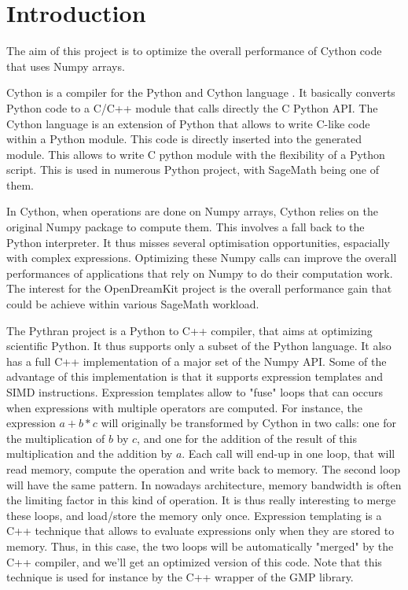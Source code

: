 \documentclass{deliverablereport}
\author{}
\begin{document}
\maketitle
%
\strut\githubissuedescription
\newpage\tableofcontents\newpage

\section{Introduction}

The aim of this project is to optimize the overall performance of Cython code
that uses Numpy arrays.

Cython is a compiler for the Python and Cython language . It basically converts
Python code to a C/C++ module that calls directly the C Python API. The Cython
language is an extension of Python that allows to write C-like code within a
Python module. This code is directly inserted into the generated module. This
allows to write C python module with the flexibility of a Python script. This
is used in numerous Python project, with SageMath being one of them.

In Cython, when operations are done on Numpy arrays, Cython relies on the
original Numpy package to compute them. This involves a fall back to the Python
interpreter. It thus misses several optimisation opportunities, espacially with
complex expressions. Optimizing these Numpy calls can improve the overall
performances of applications that rely on Numpy to do their computation work.
The interest for the OpenDreamKit project is the overall performance gain that
could be achieve within various SageMath workload.

The Pythran project is a Python to C++ compiler, that aims at optimizing
scientific Python. It thus supports only a subset of the Python language.
It also has a full C++ implementation of a major set of the Numpy API. Some of
the advantage of this implementation is that it supports expression templates
and SIMD instructions. Expression templates allow to "fuse" loops that can
occurs when expressions with multiple operators are computed. For instance,
the expression $a+b*c$ will originally be transformed by Cython in two calls: one
for the multiplication of $b$ by $c$, and one for the addition of the result of
this multiplication and the addition by $a$. Each call will end-up in one loop,
that will read memory, compute the operation and write back to memory. The
second loop will have the same pattern. In nowadays architecture, memory
bandwidth is often the limiting factor in this kind of operation. It is thus
really interesting to merge these loops, and load/store the memory only once.
Expression templating is a C++ technique that allows to evaluate expressions
only when they are stored to memory. Thus, in this case, the two loops will be
automatically "merged" by the C++ compiler, and we'll get an optimized version
of this code. Note that this technique is used for instance by the C++ wrapper
of the GMP library.
\end{document}

